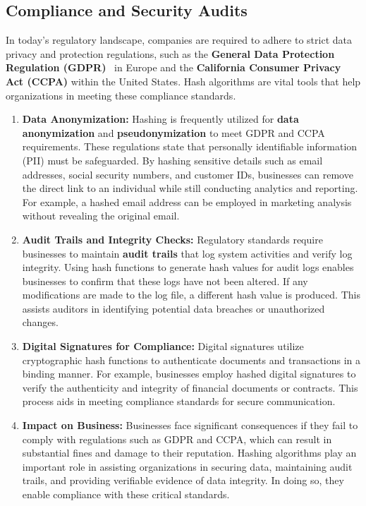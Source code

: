 \documentclass[11pt,a4paper]{article}
\begin{document}
    \subsection*{Compliance and Security Audits}
    In today’s regulatory landscape, companies are required to adhere to strict data privacy and protection regulations, such as the \textbf{General Data Protection Regulation (GDPR)}~\cite{GDPR} in Europe and the \textbf{California Consumer Privacy Act (CCPA)}\cite{CCPA} within the United States. Hash algorithms are vital tools that help organizations in meeting these compliance standards.
        \begin{enumerate}
            \item \textbf{Data Anonymization:}
            \newline
            Hashing is frequently utilized for \textbf{data anonymization} and \textbf{pseudonymization} to meet GDPR and CCPA requirements. These regulations state that personally identifiable information (PII) must be safeguarded. By hashing sensitive details such as email addresses, social security numbers, and customer IDs, businesses can remove the direct link to an individual while still conducting analytics and reporting. For example, a hashed email address can be employed in marketing analysis without revealing the original email.

            \item \textbf{Audit Trails and Integrity Checks:}
            \newline
            Regulatory standards require businesses to maintain \textbf{audit trails} that log system activities and verify log integrity. Using hash functions to generate hash values for audit logs enables businesses to confirm that these logs have not been altered. If any modifications are made to the log file, a different hash value is produced. This assists auditors in identifying potential data breaches or unauthorized changes.

            \item \textbf{Digital Signatures for Compliance:}
            \newline
            Digital signatures utilize cryptographic hash functions to authenticate documents and transactions in a binding manner. For example, businesses employ hashed digital signatures to verify the authenticity and integrity of financial documents or contracts. This process aids in meeting compliance standards for secure communication.

            \item \textbf{Impact on Business:}
            \newline
            Businesses face significant consequences if they fail to comply with regulations such as GDPR and CCPA, which can result in substantial fines and damage to their reputation. Hashing algorithms play an important role in assisting organizations in securing data, maintaining audit trails, and providing verifiable evidence of data integrity. In doing so, they enable compliance with these critical standards.

        \end{enumerate}
\end{document}
